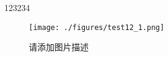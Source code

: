 
123234

\begin{figure}[ht]
\centering
\texttt{[image: ./figures/test12\_1.png]}
\caption{请添加图片描述} \label{test12_fig1}
\end{figure}
